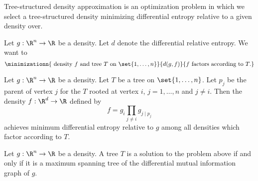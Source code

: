 

Tree-structured density
approximation is an
optimization problem in which we
select a tree-structured density
minimizing differential entropy
relative to a given density over.


Let $g: \R^n \to \R$ be a density.
Let $d$ denote the differential
relative entropy.
We want to
\[
  \minimizationn{
    \text{ density } f \text{ and tree } T \text{ on } \set{1, \dots, n}
  }{
    d(g, f)
  }{
    f \text{ factors according to } T.
  }
\]


\begin{prop}
  Let $g: \R^n \to \R$ be a density.
  Let $T$ be
  a tree on $\set{1, \dots, n}$.
  Let $p_j$ be
  the parent of vertex $j$ for the $T$ rooted
  at vertex $i$, $j = 1,\dots,n$ and $j \neq i$.
  Then the density $f: \R^d \to \R$ defined by
  \[
    f = g_i \prod_{j \neq i} g_{j \mid p_j}
  \]
  achieves minimum differential entropy relative to $g$ among
  all densities which factor according to $T$.
\end{prop}

\begin{prop}
  Let $g: \R^n \to \R$ be a density.
  A tree $T$ is a solution to the problem above
  if and only if it is a maximum spanning
  tree of the differential mutual information graph of $g$.
\end{prop}
\strats
